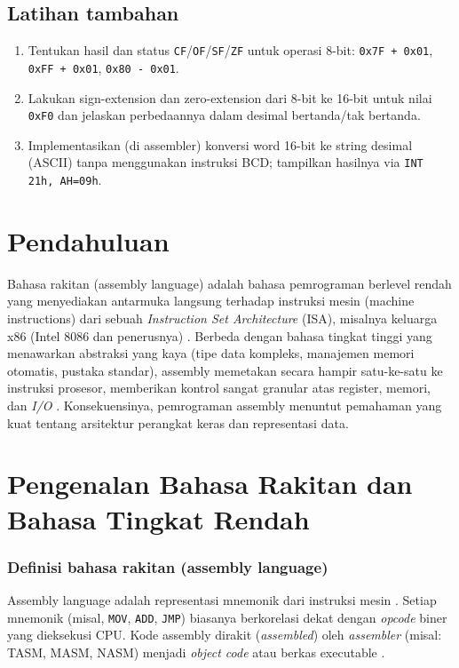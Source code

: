 \subsection{Latihan tambahan}
\begin{enumerate}
  \item Tentukan hasil dan status \texttt{CF}/\texttt{OF}/\texttt{SF}/\texttt{ZF} untuk operasi 8-bit: \texttt{0x7F + 0x01}, \texttt{0xFF + 0x01}, \texttt{0x80 - 0x01}.
  \item Lakukan sign-extension dan zero-extension dari 8-bit ke 16-bit untuk nilai \texttt{0xF0} dan jelaskan perbedaannya dalam desimal bertanda/tak bertanda.
  \item Implementasikan (di assembler) konversi word 16-bit ke string desimal (ASCII) tanpa menggunakan instruksi BCD; tampilkan hasilnya via \texttt{INT 21h, AH=09h}.
\end{enumerate}

\section{Pendahuluan}\label{sec:pengenalan-pendahuluan}
Bahasa rakitan (assembly language) adalah bahasa pemrograman berlevel rendah yang menyediakan antarmuka langsung terhadap instruksi mesin (machine instructions) dari sebuah \textit{Instruction Set Architecture} (ISA), misalnya keluarga x86 (Intel 8086 dan penerusnya) \cite{intel2019manual32}. Berbeda dengan bahasa tingkat tinggi yang menawarkan abstraksi yang kaya (tipe data kompleks, manajemen memori otomatis, pustaka standar), assembly memetakan secara hampir satu-ke-satu ke instruksi prosesor, memberikan kontrol sangat granular atas register, memori, dan \textit{I/O} \cite{hyde2010art}. Konsekuensinya, pemrograman assembly menuntut pemahaman yang kuat tentang arsitektur perangkat keras dan representasi data.

\section{Pengenalan Bahasa Rakitan dan Bahasa Tingkat Rendah}\label{sec:pengenalan-bahasa}
\subsubsection{Definisi bahasa rakitan (assembly language)}
Assembly language adalah representasi mnemonik dari instruksi mesin \cite{susanto1995belajar}. Setiap mnemonik (misal, \texttt{MOV}, \texttt{ADD}, \texttt{JMP}) biasanya berkorelasi dekat dengan \textit{opcode} biner yang dieksekusi CPU. Kode assembly dirakit (\textit{assembled}) oleh \textit{assembler} (misal: TASM, MASM, NASM) menjadi \textit{object code} atau berkas executable \cite{hyde2010art}.

